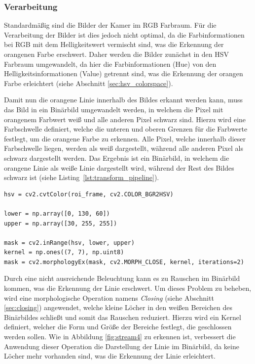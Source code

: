         \subsubsection{Verarbeitung}
        Standardmäßig sind die Bilder der Kamer im RGB Farbraum. Für die Verarbeitung der Bilder ist dies jedoch nicht optimal, da die Farbinformationen bei RGB mit dem Helligkeitswert vermischt sind, was die Erkennung der orangenen Farbe erschwert. Daher werden die Bilder zunächst in den HSV Farbraum umgewandelt, da hier die Farbinformationen (Hue) von den Helligkeitsinformationen (Value) getrennt sind, was die Erkennung der orangen Farbe erleichtert (siehe Abschnitt \ref{sec:hsv_colorspace}). 

        Damit nun die orangene Linie innerhalb des Bildes erkannt werden kann, muss das Bild in ein Binärbild umgewandelt werden, in welchem die Pixel mit orangenem Farbwert weiß und alle anderen Pixel schwarz sind. Hierzu wird eine Farbschwelle definiert, welche die unteren und oberen Grenzen für die Farbwerte festlegt, um die orangene Farbe zu erkennen. Alle Pixel, welche innerhalb dieser Farbschwelle liegen, werden als weiß dargestellt, während alle anderen Pixel als schwarz dargestellt werden. Das Ergebnis ist ein Binärbild, in welchem die orangene Linie als weiße Linie dargestellt wird, während der Rest des Bildes schwarz ist (siehe Listing~\ref{lst:transform_pipeline}). 

        \begin{lstlisting}[caption={Ausschnitt aus der Verarbeitungspipeline}, label={lst:transform_pipeline}]
hsv = cv2.cvtColor(roi_frame, cv2.COLOR_BGR2HSV)
        
lower = np.array([0, 130, 60])
upper = np.array([30, 255, 255])

mask = cv2.inRange(hsv, lower, upper)
kernel = np.ones((7, 7), np.uint8)
mask = cv2.morphologyEx(mask, cv2.MORPH_CLOSE, kernel, iterations=2)
        \end{lstlisting}

        Durch eine nicht ausreichende Beleuchtung kann es zu Rauschen im Binärbild kommen, was die Erkennung der Linie erschwert. Um dieses Problem zu beheben, wird eine morphologische Operation namens \emph{Closing} (siehe Abschnitt \ref{sec:closing}) angewendet, welche kleine Löcher in den weißen Bereichen des Binärbildes schließt und somit das Rauschen reduziert. Hierzu wird ein Kernel definiert, welcher die Form und Größe der Bereiche festlegt, die geschlossen werden sollen. Wie in Abbildung \ref{fig:stream4} zu erkennen ist, verbessert die Anwendung dieser Operation die Darstellung der Linie im Binärbild, da keine Löcher mehr vorhanden sind, was die Erkennung der Linie erleichtert.

